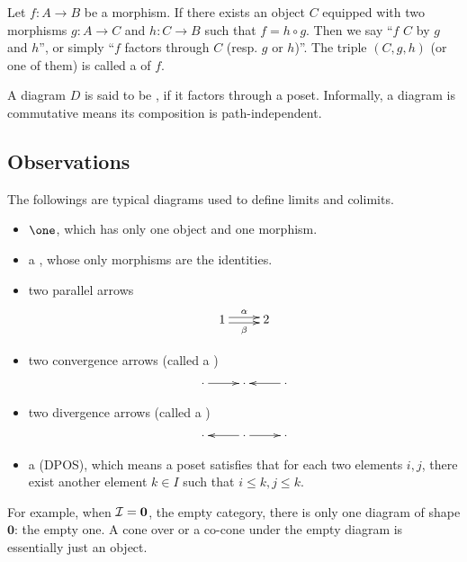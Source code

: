 \begin{defn}
  Let $f\colon A\to B$ be a morphism. If there exists an object $C$ equipped with two morphisms $g\colon A\to C$ and $h\colon C\to B$ such that $f = h\circ g$. Then we say ``$f$  $C$ by $g$ and $h$'', or simply ``$f$ factors through $C$ (resp. $g$ or $h$)''. The triple $(C,g,h)$ (or one of them) is called a  of $f$.
\end{defn}

\begin{defn}
  A diagram $D$ is said to be , if it factors through a poset. Informally, a diagram is commutative means its composition is path-independent.
\end{defn}

\subsection{Observations}
  \begin{ex}
    The followings are typical diagrams used to define limits and colimits.
    \begin{itemize}
      \item $\one$, which has only one object and one morphism.
      \item a , whose only morphisms are the identities.
      \item two parallel arrows
                     \begin{displaymath}
                           \xymatrix{
                              1\ar@<0.5ex>[r]^{\alpha}\ar@<-0.5ex>[r]_{\beta} &2
                           }
                     \end{displaymath}
      \item two convergence arrows (called a )
                \begin{displaymath}
                  \xymatrix{
                     \cdot\ar[r]&\cdot&\cdot\ar[l]
                  }
                \end{displaymath}
      \item two divergence arrows (called a )
                \begin{displaymath}
                  \xymatrix{
                     \cdot&\cdot\ar[l]\ar[r]&\cdot
                  }
                \end{displaymath}
      \item a  (DPOS), which means a poset satisfies that for each two elements $i,j$, there exist another element $k\in I$ such that $i\leqslant k,j\leqslant k$.
    \end{itemize}

    For example, when ${\cal I}=\mathbf{0}$, the empty category, there is only one diagram of shape $\mathbf{0}$: the empty one. A cone over or a co-cone under the empty diagram is essentially just an object.
  \end{ex}


